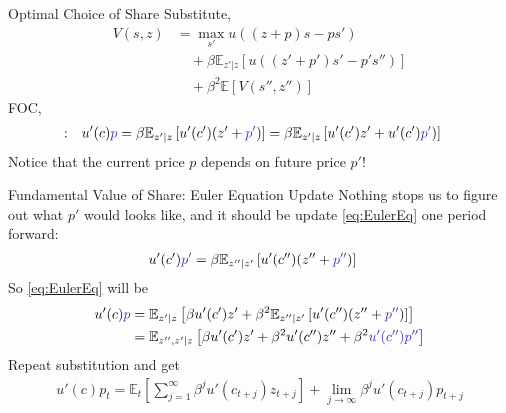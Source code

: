 \documentclass[handout, 11pt,aspectratio=43,usenames,dvipsnames]{beamer}
\newcommand{\blue}[1]{\textcolor{blue}{#1}}
\theoremstyle{definition}
\begin{document}
\begin{frame}{Optimal Choice of Share}
\label{slide:Optimal_Choice_of_Share}
    Substitute,
    \begin{align*}
        V(s, z)
            & = \max_{s'} u\left(
                (z+p)s - ps'
            \right)         \\
            & \quad + \beta \mathbb{E}_{z'|z} \left[
                u\left(
                 (z'+p')s' - p's''
            \right)
            \right]
        \\
            & \quad + \beta^{2} \mathbb{E} [V(s'', z'')]
    \end{align*}
    FOC,
    \begin{align}
        [s']: \quad
            & u'(c) \blue{p} = \beta \mathbb{E}_{z'|z} \left[
                u'(c') (z' + \blue{p'})
            \right] = \beta \mathbb{E}_{z'|z} \left[
                u'(c') z' + u'(c') \blue{p'})
            \right]
            \label{eq:EulerEq}
    \end{align}
    Notice that the current price $ p $ depends on future price $ p' $!
\end{frame}

\begin{frame}{Fundamental Value of Share: Euler Equation Update}
\label{slide:Fundamental_Value_of_Share__Euler_Equation_Update}
    Nothing stops us to figure out what $ p' $ would looks like, and it should be update \eqref{eq:EulerEq} one period forward:
    \begin{align*}
        u'(c') \blue{p'} & = \beta \mathbb{E}_{z''|z'} \left[
            u'(c'') (z'' + \blue{p''})
            \right] \label{eq:EulerEqUpdate}
    \end{align*}
    So \eqref{eq:EulerEq} will be
    \begin{align}
        u'(c) \blue{p}
            & = \mathbb{E}_{z'|z} \left[
                \beta u'(c') z' + \beta^{2} \mathbb{E}_{z''|z'} \left[
                u'(c'') (z'' + \blue{p''})
            \right]
            \right]
        \\
            & = \mathbb{E}_{z'',z'|z} \left[
                \beta u'(c') z' + \beta^{2} u'(c'') z'' + \beta^{2} \blue{u'(c'')p''}
            \right]
    \end{align}
    Repeat substitution and get
    \begin{align}
        u'(c) p_{t} = \mathbb{E}_{t}\left[
            \sum_{j=1}^{\infty} \beta^{j} u'(c_{t+j}) z_{t+j}
        \right]
        +
        \lim_{j\rightarrow \infty} \beta^{j} u'(c_{t+j}) p_{t+j}
    \end{align}
\end{frame}
\end{document}

